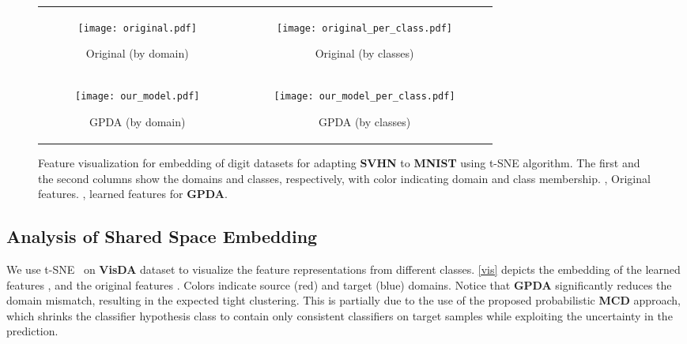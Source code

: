 \documentclass[10pt,letterpaper]{article}
\begin{document}
\begin{figure}[h]
\vspace{-1.3em}
\centering\setlength\tabcolsep{1.5pt}
     \begin{tabular}{cc} 
\vspace{-0.5em}
    \begin{subfigure}[b]{0.45\linewidth}
    \texttt{[image: original.pdf]}
    \caption{Original (by domain)\label{fig:embed_d_orig}}
    \end{subfigure}
    &
    \begin{subfigure}[b]{0.45\linewidth}
	 \texttt{[image: original\_per\_class.pdf]}
	 \caption{Original (by classes)
	 \label{fig:embed_c_orig}}
	 \end{subfigure}
	\\
	 \vspace{-0.8em}
\begin{subfigure}[b]{0.45\linewidth}
       \texttt{[image: our\_model.pdf]}
       \caption{GPDA (by domain)\label{fig:embed_d_all}}
     \end{subfigure}
     & 
	\begin{subfigure}[b]{0.45\linewidth}
	\texttt{[image: our\_model\_per\_class.pdf]}
	\caption{GPDA (by classes)\label{fig:embed_c_all}}
	\end{subfigure}
    \end{tabular}
    \caption{Feature visualization for embedding of digit datasets for adapting \textbf{SVHN} to \textbf{MNIST} using t-SNE algorithm. The first and the second columns show the domains and classes, respectively, with color indicating domain and class membership. \protect{},\protect{} Original features.
     \protect{},\protect{} learned features for \textbf{GPDA}.
     }
     \label{vis}
\end{figure}









\subsection{Analysis of Shared Space Embedding}
We use t-SNE~\cite{maaten2008visualizing} on \textbf{VisDA} dataset to visualize the feature representations from different classes. \autoref{vis} depicts the embedding of the learned features , and the original features . Colors indicate source (red) and target (blue) domains. Notice that \textbf{GPDA} significantly reduces the domain mismatch, resulting in the expected tight clustering. This is partially due to the use of the proposed probabilistic \textbf{MCD} approach, which shrinks the classifier hypothesis class to contain only consistent classifiers on target samples while exploiting the uncertainty in the prediction.
\end{document}
